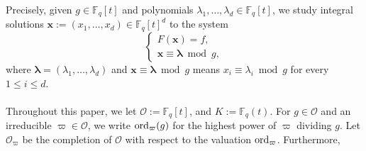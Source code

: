 \documentclass[10pt]{amsart}
\theoremstyle{plain}
\theoremstyle{plain}
\renewcommand{\vec}[1]{\mathbf{#1}}
\theoremstyle{remark}
\theoremstyle{definition}
\newcommand{\ord}{\textup{ord}}
\begin{document}
%
%
%
Precisely, given $g\in\mathbb{F}_q[t]$ and polynomials $\lambda_1,\hdots,\lambda_d\in\mathbb{F}_q[t]$, we study integral solutions $\vec{x}:=(x_1,\dots,x_d)\in \mathbb{F}_q[t]^d $ to the system
\begin{equation}\label{maineq}\begin{cases}F(\vec{x})=f,\\ \vec{x}\equiv\boldsymbol{\lambda}\bmod g,\end{cases}\end{equation}
where $\boldsymbol{\lambda}=(\lambda_1,\dots,\lambda_d)$ and $\vec{x}\equiv\boldsymbol{\lambda}\bmod g$ means $x_i\equiv \lambda_i\bmod g$ for every $1\leq i\leq d$.\\
\\
Throughout this paper, we let $\mathcal{O}:=\mathbb{F}_q[t]$, and $K:=\mathbb{F}_q(t)$. For $g\in\mathcal{O}$ and an irreducible $\varpi \in \mathcal{O}$, we write  $\ord_{\varpi}(g)$ for the highest power of $\varpi$ dividing $g$. Let $\mathcal{O}_{\varpi}$ be the completion of $\mathcal{O}$ with respect to the valuation $\ord_{\varpi}$. Furthermore,
\end{document}
